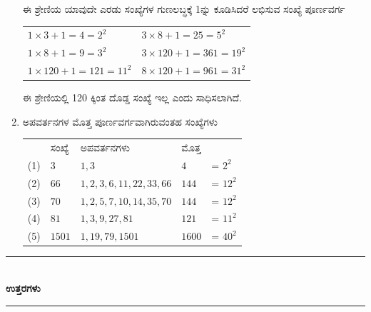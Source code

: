 \begin{enumerate}
ಈ ಶ್ರೇಣಿಯ ಯಾವುದೇ ಎರಡು ಸಂಖ್ಯೆಗಳ ಗುಣಲಬ್ಧಕ್ಕೆ 1ನ್ನು ಕೂಡಿಸಿದರೆ ಲಭಿಸುವ ಸಂಖ್ಯೆ ಪೂರ್ಣವರ್ಗ 

\vskip 0.2cm

\begin{tabular}[t]{ll}
$1 \times 3 + 1 = 4 = 2^{2}$ & $3\times 8 + 1 = 25 = 5^{2}$\\
$1 \times 8 + 1 = 9 =3^{2}$ & $3\times 120 + 1 = 361 = 19^{2}$\\
$1 \times 120 + 1 = 121 = 11^{2}$ & $8\times 120 + 1 = 961 = 31^{2}$\\
\end{tabular}

\vskip 0.1cm

ಈ ಶ್ರೇಣಿಯಲ್ಲಿ 120 ಕ್ಕಿಂತ ದೊಡ್ಡ ಸಂಖ್ಯೆ ಇಲ್ಲ ಎಂದು ಸಾಧಿಸಲಾಗಿದೆ. 

\item ಅಪವರ್ತನಗಳ ಮೊತ್ತ ಪೂರ್ಣವರ್ಗವಾಗಿರುವಂತಹ ಸಂಖ್ಯೆಗಳು 

\begin{tabular}[t]{lllll}
 & ಸಂಖ್ಯೆ & ಅಪವರ್ತನಗಳು & ಮೊತ್ತ & \\
 (1) & $3$ & $1, 3$ & $4$ & = $2^{2}$\\
 (2) & $66$ & $1, 2, 3, 6, 11, 22, 33, 66$ & $144$ & = $12^{2}$\\
 (3) & $70$ & $1, 2, 5, 7, 10, 14, 35, 70$ & $144$ & = $12^{2}$\\
 (4) & $81$ & $1, 3, 9, 27, 81$ & $121$ & = $11^{2}$\\
 (5) & $1501$ & $1, 19, 79, 1501$ & $1600$ & = $40^{2}$
\end{tabular}
\end{enumerate}

\smallskip

\begin{center}
\rule{5cm}{1pt}\\[3pt]
{\Large\bfseries ಉತ್ತರಗಳು}\\[-0.1cm]
\rule{5cm}{1pt}
\end{center}

